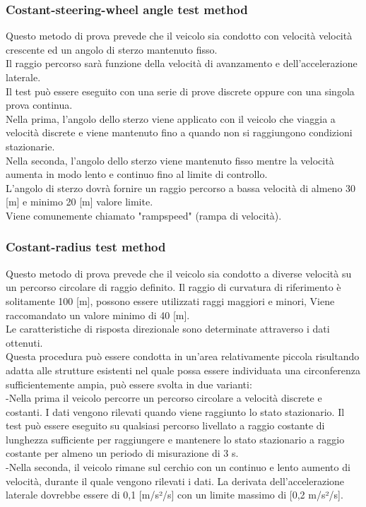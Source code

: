 \subsubsection{Costant-steering-wheel angle test method}
Questo metodo di prova prevede che il veicolo sia condotto con velocità velocità crescente ed un angolo di sterzo mantenuto fisso.\\ 
Il raggio percorso sarà funzione della velocità di avanzamento e dell'accelerazione laterale.\\
Il test può essere eseguito con una serie di prove discrete oppure con una singola prova continua.\\
Nella prima, l'angolo dello sterzo viene applicato con il veicolo che viaggia a velocità discrete e viene mantenuto fino a quando non si raggiungono condizioni stazionarie.\\ 
Nella seconda, l'angolo dello sterzo viene mantenuto fisso mentre la velocità aumenta in modo lento e continuo fino al limite di controllo.\\
L'angolo di sterzo dovrà fornire un raggio percorso a bassa velocità di almeno 30 [m] e minimo 20 [m] valore limite.\\
Viene comunemente chiamato "rampspeed" (rampa di velocità).
\subsubsection{Costant-radius test method}
Questo metodo di prova prevede che il veicolo sia condotto a diverse velocità su un percorso circolare di raggio definito. Il raggio di curvatura di riferimento è solitamente 100 [m], possono essere utilizzati raggi maggiori e minori, Viene raccomandato un valore minimo di 40 [m]. \\
Le caratteristiche di risposta direzionale sono determinate attraverso i dati ottenuti.\\
Questa procedura può essere condotta in un'area relativamente piccola risultando adatta alle strutture esistenti nel quale
possa essere individuata una circonferenza sufficientemente ampia, può essere svolta in due varianti: \\
-Nella prima il veicolo percorre un percorso circolare a velocità discrete e costanti. 
I dati vengono rilevati quando viene raggiunto lo stato stazionario. 
Il test può essere eseguito su qualsiasi percorso livellato a raggio costante di lunghezza sufficiente per raggiungere e 
mantenere lo stato stazionario a raggio costante per almeno un periodo di misurazione di 3 s.\\
-Nella seconda, il veicolo rimane sul cerchio con un continuo e lento aumento di velocità, durante il quale vengono
rilevati i dati. La derivata dell'accelerazione laterale dovrebbe essere di 0,1 [m/s²/s] con un limite massimo di [0,2 m/s²/s].


